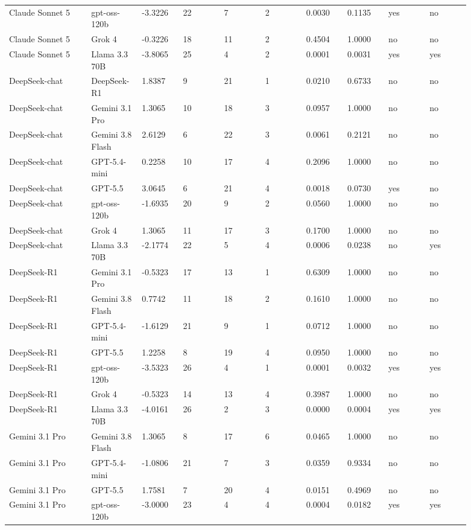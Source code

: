 \begin{landscape}
\begin{longtable}{p{0.162\linewidth}p{0.081\linewidth}p{0.081\linewidth}p{0.081\linewidth}p{0.081\linewidth}p{0.081\linewidth}p{0.081\linewidth}p{0.081\linewidth}p{0.081\linewidth}p{0.081\linewidth}}
Claude Sonnet 5 & gpt-oss-120b & -3.3226 & 22 & 7 & 2 & 0.0030 & 0.1135 & yes & no \\
Claude Sonnet 5 & Grok 4 & -0.3226 & 18 & 11 & 2 & 0.4504 & 1.0000 & no & no \\
Claude Sonnet 5 & Llama 3.3 70B & -3.8065 & 25 & 4 & 2 & 0.0001 & 0.0031 & yes & yes \\
DeepSeek-chat & DeepSeek-R1 & 1.8387 & 9 & 21 & 1 & 0.0210 & 0.6733 & no & no \\
DeepSeek-chat & Gemini 3.1 Pro & 1.3065 & 10 & 18 & 3 & 0.0957 & 1.0000 & no & no \\
DeepSeek-chat & Gemini 3.8 Flash & 2.6129 & 6 & 22 & 3 & 0.0061 & 0.2121 & no & no \\
DeepSeek-chat & GPT-5.4-mini & 0.2258 & 10 & 17 & 4 & 0.2096 & 1.0000 & no & no \\
DeepSeek-chat & GPT-5.5 & 3.0645 & 6 & 21 & 4 & 0.0018 & 0.0730 & yes & no \\
DeepSeek-chat & gpt-oss-120b & -1.6935 & 20 & 9 & 2 & 0.0560 & 1.0000 & no & no \\
DeepSeek-chat & Grok 4 & 1.3065 & 11 & 17 & 3 & 0.1700 & 1.0000 & no & no \\
DeepSeek-chat & Llama 3.3 70B & -2.1774 & 22 & 5 & 4 & 0.0006 & 0.0238 & no & yes \\
DeepSeek-R1 & Gemini 3.1 Pro & -0.5323 & 17 & 13 & 1 & 0.6309 & 1.0000 & no & no \\
DeepSeek-R1 & Gemini 3.8 Flash & 0.7742 & 11 & 18 & 2 & 0.1610 & 1.0000 & no & no \\
DeepSeek-R1 & GPT-5.4-mini & -1.6129 & 21 & 9 & 1 & 0.0712 & 1.0000 & no & no \\
DeepSeek-R1 & GPT-5.5 & 1.2258 & 8 & 19 & 4 & 0.0950 & 1.0000 & no & no \\
DeepSeek-R1 & gpt-oss-120b & -3.5323 & 26 & 4 & 1 & 0.0001 & 0.0032 & yes & yes \\
DeepSeek-R1 & Grok 4 & -0.5323 & 14 & 13 & 4 & 0.3987 & 1.0000 & no & no \\
DeepSeek-R1 & Llama 3.3 70B & -4.0161 & 26 & 2 & 3 & 0.0000 & 0.0004 & yes & yes \\
Gemini 3.1 Pro & Gemini 3.8 Flash & 1.3065 & 8 & 17 & 6 & 0.0465 & 1.0000 & no & no \\
Gemini 3.1 Pro & GPT-5.4-mini & -1.0806 & 21 & 7 & 3 & 0.0359 & 0.9334 & no & no \\
Gemini 3.1 Pro & GPT-5.5 & 1.7581 & 7 & 20 & 4 & 0.0151 & 0.4969 & no & no \\
Gemini 3.1 Pro & gpt-oss-120b & -3.0000 & 23 & 4 & 4 & 0.0004 & 0.0182 & yes & yes \\

\end{longtable}
\end{landscape}
